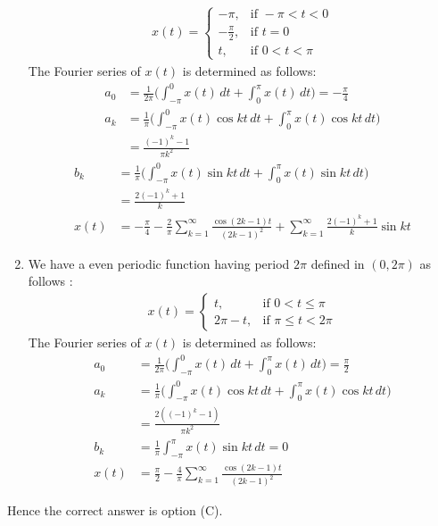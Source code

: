 \documentclass[journal,12pt,twocolumn]{IEEEtran}
\begin{document}
\begin{enumerate}
\begin{align}
x(t)=  
\begin{cases}
-\pi, & \text{if } -\pi < t < 0\\
-\frac{\pi}{2}, & \text{if } t=0\\
t, & \text{if } 0 < t < \pi \nonumber
\end{cases}
\end{align}
The Fourier series of $x(t)$ is determined as follows:
\begin{align}
a_{0} &=\frac{1}{2\pi}\Bigg({\int_{-\pi}^{0}x(t)\, dt}+{\int_{0}^{\pi}x(t)\, dt}\Bigg)= -\frac{\pi}{4} \nonumber \\
a_{k} &= \frac{1}{\pi}\Bigg({\int_{-\pi}^{0}x(t)\cos{kt}\, dt}+{\int_{0}^{\pi}x(t)\cos{kt}\, dt}\Bigg) \nonumber \\
&= \frac{(-1)^{k}-1}{\pi k^{2}}\nonumber
\end{align}
\begin{align}
b_{k} &= \frac{1}{\pi}\Bigg({\int_{-\pi}^{0}x(t)\sin{kt}\, dt}+{\int_{0}^{\pi}x(t)\sin{kt}\, dt}\Bigg) \nonumber \\
&= \frac{2(-1)^{k}+1}{k}\nonumber \\
x(t) &= -\frac{\pi}{4}-\frac{2}{\pi}\sum_{k=1}^{\infty}\frac{\cos{(2k-1)t}}{(2k-1)^{2}}+\sum_{k=1}^{\infty}\frac{2(-1)^{k}+1}{k}\sin{kt}
\end{align}
\item We have a even periodic function having period $2\pi$ defined in $(0,2\pi)$ as follows :
\begin{align}
x(t)=  
\begin{cases}
t, & \text{if } 0 < t \leq \pi\\
2\pi-t, & \text{if } \pi \leq  t <  2\pi \nonumber
\end{cases}
\end{align}
The Fourier series of $x(t)$ is determined as follows:
\begin{align}
a_{0} &=\frac{1}{2\pi}\Bigg({\int_{-\pi}^{0}x(t)\, dt}+{\int_{0}^{\pi}x(t)\, dt}\Bigg)= \frac{\pi}{2} \nonumber \\
a_{k} &= \frac{1}{\pi}\Bigg({\int_{-\pi}^{0}x(t)\cos{kt}\, dt}+{\int_{0}^{\pi}x(t)\cos{kt}\, dt}\Bigg) \nonumber \\
&= \frac{2((-1)^{k}-1)}{\pi k^{2}}\nonumber \\
b_{k} &= \frac{1}{\pi}{\int_{-\pi}^{\pi}x(t)\sin{kt}\, dt} = 0\nonumber \\
x(t) &= \frac{\pi}{2}-\frac{4}{\pi}\sum_{k=1}^{\infty}\frac{\cos{(2k-1)t}}{(2k-1)^{2}}
\end{align}
\end{enumerate}
Hence the correct answer is option (C).
\end{document}
